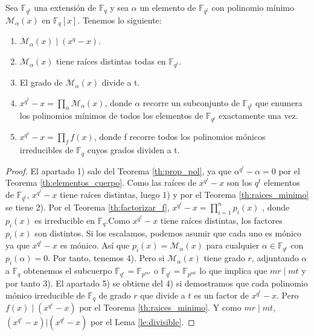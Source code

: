 \begin{theorem}
Sea $\mathbb{F}_{q^t}$ una extensión de $\mathbb{F}_{q}$ y sea $\alpha$ un elemento de $\mathbb{F}_{q^t}$ con polinomio mínimo $\mathcal{M}_\alpha(x)$ en $\mathbb{F}_q[x]$. Tenemos lo siguiente:
\begin{enumerate}
	\item $\mathcal{M}_\alpha(x) \mid (x^q-x)$.
	\item $\mathcal{M}_\alpha(x)$ tiene raíces distintas todas en $\mathbb{F}_{q^t}$.
	\item El grado de $\mathcal{M}_\alpha(x)$ divide a t.
	\item  $x^{q^t} - x = \prod_\alpha \mathcal{M}_\alpha(x)$, donde $\alpha$ recorre un subconjunto de $\mathbb{F}_{q^t}$ que enumera los polinomios mínimos de todos los elementos de $\mathbb{F}_{q^t}$ exactamente una vez.
	\item $x^{q^t}-x = \prod_f f(x)$, donde f recorre todos los polinomios mónicos irreducibles de $\mathbb{F}_q$ cuyos grados dividen a t.
\end{enumerate}
\end{theorem}

\begin{proof}
El apartado 1) sale del Teorema \ref{th:prop_pol}, ya que $\alpha^{q^t}-\alpha = 0$ por el Teorema \ref{th:elementos_cuerpo}. Como las raíces de $x^{q^t}-x$ son los $q^t$ elementos de $\mathbb{F}_{q^t}$, $x^{q^t}-x$ tiene raíces distintas, luego 1) y por el Teorema \ref{th:raices_minimo} se tiene 2). Por el Teorema \ref{th:factorizar_f}, $x^{q^t}-x = \prod_{i=1}^n p_i(x)$ , donde $p_i(x)$ es irreducible en $\mathbb{F}_{q}$.Como $x^{q^t}-x$ tiene raíces distintas, los factores $p_i(x)$ son distintos. Si los escalamos, podemos asumir que cada uno es mónico ya que $x^{q^t}-x$ es mónico. Así que $p_i(x) = \mathcal{M}_\alpha(x)$ para cualquier $\alpha \in \mathbb{F}_{q^t}$ con $p_i(\alpha) = 0$. Por tanto, tenemos 4). Pero si $\mathcal{M}_\alpha(x)$ tiene grado $r$, adjuntando $\alpha$ a $\mathbb{F}_{q}$ obtenemos el subcuerpo $\mathbb{F}_{q^r} = \mathbb{F}_{p^{mr} }$ o $\mathbb{F}_{q^t} = \mathbb{F}_{p^{mt}}$ lo que implica que $ mr \mid mt$ y por tanto 3). El apartado 5) se obtiene del 4) si demostramos que cada polinomio mónico irreducible de $\mathbb{F}_{q}$ de grado $r$ que divide a $t$ es un factor de $x^{q^t}-x$. Pero $f(x) \mid (x^{q^r}-x)$ por el Teorema \ref{th:raices_minimo}. Y como $mr \mid mt$, $(x^{q^r}-x) | (x^{q^t}-x)$ por el Lema \ref{le:divisible}.

\end{proof}

